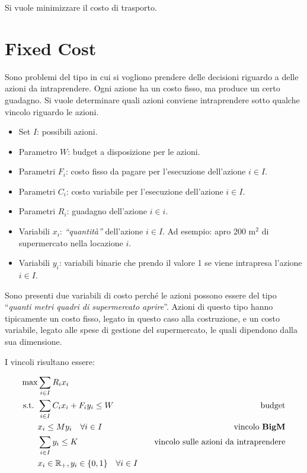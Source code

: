 Si vuole minimizzare il costo di trasporto.

\section{Fixed Cost}

Sono problemi del tipo in cui si vogliono prendere delle decisioni riguardo a delle azioni da intraprendere.
Ogni azione ha un costo fisso, ma produce un certo guadagno.
Si vuole determinare quali azioni conviene intraprendere sotto qualche vincolo riguardo le azioni.

\begin{itemize}
	\item Set $I$: possibili azioni.
	\item Parametro $W$: budget a disposizione per le azioni.
	\item Parametri $F_i$: costo fisso da pagare per l'esecuzione dell'azione $i \in I$.
	\item Parametri $C_i$: costo variabile per l'esecuzione dell'azione $i \in I$.
	\item Parametri $R_i$: guadagno dell'azione $i \in i$.
	\item Variabili $x_i$: \textit{``quantità''} dell'azione $i \in I$. Ad esempio: apro 200 $\text{m}^2$ di supermercato nella locazione $i$.
	\item Variabili $y_i$: variabili binarie che prendo il valore 1 se viene intrapresa l'azione $i \in I$.
\end{itemize}

Sono presenti due variabili di costo perché le azioni possono essere del tipo ``\textit{quanti metri quadri di supermercato aprire}''. Azioni di questo tipo hanno tipicamente un costo fisso, legato in questo caso alla costruzione, e un costo variabile, legato alle spese di gestione del supermercato, le quali dipendono dalla sua dimensione.

I vincoli risultano essere:

\begin{align*}
	\max &\sum\limits_{i \in I} R_i x_i \\
	\text{s.t. } &\sum\limits_{i \in I} C_i x_i + F_i y_i \leq W &\quad\text{budget} \\
	&x_i \leq M y_i  \quad \forall i \in I &\quad\text{vincolo \textbf{BigM}}  \\
	&\sum\limits_{i \in I} y_i \leq K &\quad\text{vincolo sulle azioni da intraprendere} \\
	&x_i \in \mathbb{R}_+, y_i \in \{0,1\} \quad \forall i \in I&
\end{align*}

